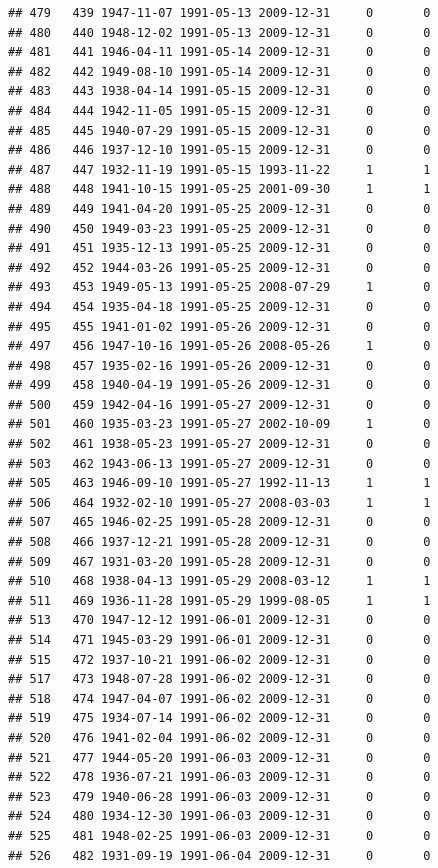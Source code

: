 \documentclass[
]{book}
\begin{document}
\begin{verbatim}
## 479   439 1947-11-07 1991-05-13 2009-12-31     0       0
## 480   440 1948-12-02 1991-05-13 2009-12-31     0       0
## 481   441 1946-04-11 1991-05-14 2009-12-31     0       0
## 482   442 1949-08-10 1991-05-14 2009-12-31     0       0
## 483   443 1938-04-14 1991-05-15 2009-12-31     0       0
## 484   444 1942-11-05 1991-05-15 2009-12-31     0       0
## 485   445 1940-07-29 1991-05-15 2009-12-31     0       0
## 486   446 1937-12-10 1991-05-15 2009-12-31     0       0
## 487   447 1932-11-19 1991-05-15 1993-11-22     1       1
## 488   448 1941-10-15 1991-05-25 2001-09-30     1       1
## 489   449 1941-04-20 1991-05-25 2009-12-31     0       0
## 490   450 1949-03-23 1991-05-25 2009-12-31     0       0
## 491   451 1935-12-13 1991-05-25 2009-12-31     0       0
## 492   452 1944-03-26 1991-05-25 2009-12-31     0       0
## 493   453 1949-05-13 1991-05-25 2008-07-29     1       0
## 494   454 1935-04-18 1991-05-25 2009-12-31     0       0
## 495   455 1941-01-02 1991-05-26 2009-12-31     0       0
## 497   456 1947-10-16 1991-05-26 2008-05-26     1       0
## 498   457 1935-02-16 1991-05-26 2009-12-31     0       0
## 499   458 1940-04-19 1991-05-26 2009-12-31     0       0
## 500   459 1942-04-16 1991-05-27 2009-12-31     0       0
## 501   460 1935-03-23 1991-05-27 2002-10-09     1       0
## 502   461 1938-05-23 1991-05-27 2009-12-31     0       0
## 503   462 1943-06-13 1991-05-27 2009-12-31     0       0
## 505   463 1946-09-10 1991-05-27 1992-11-13     1       1
## 506   464 1932-02-10 1991-05-27 2008-03-03     1       1
## 507   465 1946-02-25 1991-05-28 2009-12-31     0       0
## 508   466 1937-12-21 1991-05-28 2009-12-31     0       0
## 509   467 1931-03-20 1991-05-28 2009-12-31     0       0
## 510   468 1938-04-13 1991-05-29 2008-03-12     1       1
## 511   469 1936-11-28 1991-05-29 1999-08-05     1       1
## 513   470 1947-12-12 1991-06-01 2009-12-31     0       0
## 514   471 1945-03-29 1991-06-01 2009-12-31     0       0
## 515   472 1937-10-21 1991-06-02 2009-12-31     0       0
## 517   473 1948-07-28 1991-06-02 2009-12-31     0       0
## 518   474 1947-04-07 1991-06-02 2009-12-31     0       0
## 519   475 1934-07-14 1991-06-02 2009-12-31     0       0
## 520   476 1941-02-04 1991-06-02 2009-12-31     0       0
## 521   477 1944-05-20 1991-06-03 2009-12-31     0       0
## 522   478 1936-07-21 1991-06-03 2009-12-31     0       0
## 523   479 1940-06-28 1991-06-03 2009-12-31     0       0
## 524   480 1934-12-30 1991-06-03 2009-12-31     0       0
## 525   481 1948-02-25 1991-06-03 2009-12-31     0       0
## 526   482 1931-09-19 1991-06-04 2009-12-31     0       0

\end{verbatim}
\end{document}
